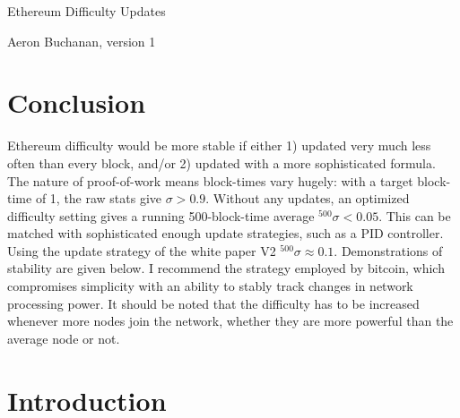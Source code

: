 \documentclass[10pt,a4paper]{article}
\begin{document}
\begin{center}
{\huge Ethereum Difficulty Updates}

{\small Aeron Buchanan, version 1}
\end{center} 

\section*{Conclusion}
Ethereum difficulty would be more stable if either 1) updated very much less often than every block, and/or 2) updated with a more sophisticated formula. The nature of proof-of-work means block-times vary hugely: with a target block-time of 1, the raw stats give $\sigma>0.9$. Without any updates, an optimized difficulty setting gives a running 500-block-time average $^{500}\sigma<0.05$. This can be matched with sophisticated enough update strategies, such as a PID controller. Using the update strategy of the white paper V2 $^{500}\sigma\approx0.1$. Demonstrations of stability are given below. I recommend the strategy employed by bitcoin, which compromises simplicity with an ability to stably track changes in network processing power. It should be noted that the difficulty has to be increased whenever more nodes join the network, whether they are more powerful than the average node or not.

\section*{Introduction}
\end{document}

